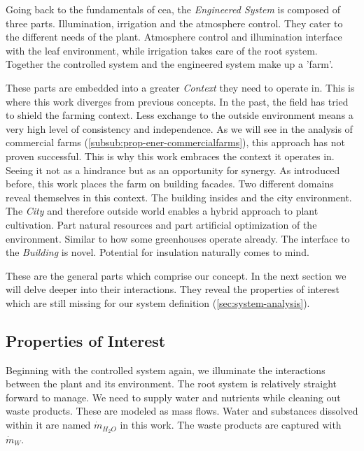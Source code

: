 Going back to the fundamentals of \ac{cea}, the \textit{Engineered System} is composed of three parts.
Illumination, irrigation and the atmosphere control.
They cater to the different needs of the plant.
Atmosphere control and illumination interface with the leaf environment, while irrigation takes care of the root system.
Together the controlled system and the engineered system make up a 'farm'.

These parts are embedded into a greater \textit{Context} they need to operate in.
This is where this work diverges from previous concepts.
In the past, the field has tried to shield the farming context.
Less exchange to the outside environment means a very high level of consistency and independence.
As we will see in the analysis of commercial farms (\ref{subsub:prop-ener-commercialfarms}), this approach has not proven successful.
This is why this work embraces the context it operates in.
Seeing it not as a hindrance but as an opportunity for synergy.
As introduced before, this work places the farm on building facades. %
Two different domains reveal themselves in this context.
The building insides and the city environment.
The \textit{City} and therefore outside world enables a hybrid approach to plant cultivation.
Part natural resources and part artificial optimization of the environment.
Similar to how some greenhouses operate already. 
The interface to the \textit{Building} is novel. %
Potential for insulation naturally comes to mind.

These are the general parts which comprise our concept.
In the next section we will delve deeper into their interactions.
They reveal the properties of interest which are still missing for our system definition (\ref{sec:system-analysis}).

\subsection{Properties of Interest}
\label{sub:prop-of-interest}
Beginning with the controlled system again, we illuminate the interactions between the plant and its environment.
The root system is relatively straight forward to manage.
We need to supply water and nutrients while cleaning out waste products.
These are modeled as mass flows.
Water and substances dissolved within it are named $\dot{m}_{H_2O}$ in this work.
The waste products are captured with $\dot{m}_W$.

